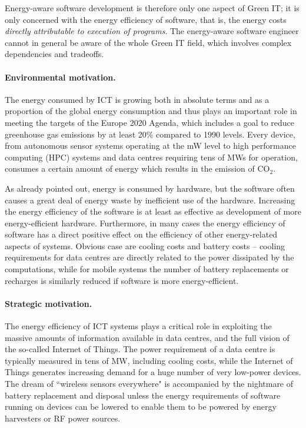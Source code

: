 \documentclass[11pt,oneside]{book}
\begin{document}
Energy-aware software development is therefore only one aspect of Green IT;  it is only concerned with the energy efficiency of software, that is, the energy costs \emph{directly attributable to execution of programs}. The energy-aware software engineer cannot in general be aware of the whole Green IT field, which involves complex dependencies and tradeoffs. 



\paragraph{Environmental motivation.}
The energy consumed by ICT is growing both in absolute terms and as a proportion of the global energy consumption and thus plays an important role in meeting the targets of the Europe 2020 Agenda, which includes a goal to reduce greenhouse gas emissions by at least 20\% compared to 1990 levels.   Every device, from autonomous sensor systems operating at the mW level to high performance computing (HPC) systems and data centres requiring tens of MWs for operation, consumes a certain amount of energy which results in the emission of CO$_2$. 

As already pointed out, energy is consumed by hardware, but the software often causes a great deal of energy waste by inefficient use of the hardware.  Increasing the energy efficiency of the software is at least as effective as development of more energy-efficient hardware.
Furthermore, in many cases the energy efficiency of software has a direct positive effect on the efficiency of other energy-related aspects of systems.  Obvious case are cooling costs and battery costs -- cooling requirements for data centres are directly related to the power dissipated by the computations, while for mobile systems the number of battery replacements or recharges is similarly reduced if software is more energy-efficient.  

\paragraph{Strategic motivation.} 
The energy efficiency of ICT systems plays a critical role in exploiting the massive amounts of information available in data centres, and the full vision of the so-called Internet of Things.  The power requirement of a data centre is typically measured in tens of MW, including cooling costs, while the Internet of Things generates increasing demand for a huge number of very low-power devices. The dream of ``wireless sensors everywhere" is accompanied by the nightmare of battery replacement and disposal unless the energy requirements of software running on devices can be lowered to enable them to be powered by energy harvesters or RF power sources.
\end{document}
